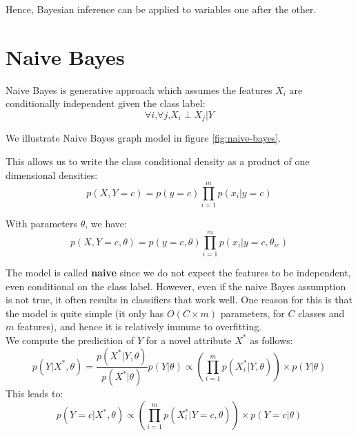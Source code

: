 \documentclass[12pt, a4paper]{article}
\theoremstyle{definition}
\numberwithin{figure}{section}
\numberwithin{equation}{section}
\numberwithin{table}{section}
\begin{document}
Hence, Bayesian inference can be applied to variables one after the other.

\section{Naive Bayes}
Naive Bayes is generative approach which assumes the features $X_i$ are conditionally independent given the class label:
\begin{equation}
    \forall i \text{,} \forall j \text{,} X_i \perp X_j | Y
\end{equation}

We illustrate Naive Bayes graph model in figure \ref{fig:naive-bayes}.


This allows us to write the class conditional density as a product of one dimensional
densities:
\begin{equation}
p(X,Y=c)=p(y=c) \prod_{i=1}^m p(x_i|y=c)
\end{equation}

With parameters $\theta$, we have:
\begin{equation}
p(X,Y=c, \theta)=p(y=c, \theta) \prod_{i=1}^m p(x_i|y=c, \theta_{ic})
\end{equation}

The model is called \textbf{naive} since we do not expect the features to be independent, even conditional on the class label. However, even if the naive Bayes assumption is not true, it often results in classiﬁers that work well. One reason for this is that the model is quite simple (it only has $O(C\times m)$ parameters, for $C$ classes and $m$ features), and hence it is relatively immune to overﬁtting.\\

We compute the predicition of $Y$ for a novel attribute $X^*$ as follows:
\begin{equation}
    p(Y|X^*, \theta)=\frac{p(X^*|Y, \theta)}{p(X^*|\theta)}p(Y|\theta)
    \propto \left(\prod_{i=1}^m p(X_i^*|Y, \theta) \right) \times p(Y|\theta)
\end{equation}
This leads to:
\begin{equation}
p(Y=c|X^*, \theta) \propto \left(\prod_{i=1}^m p(X_i^*|Y=c, \theta) \right) \times p(Y=c|\theta)
\end{equation}
\end{document}
